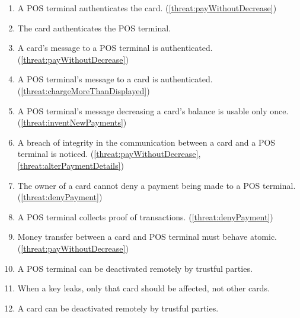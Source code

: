 \begin{enumerate}[label={SR\arabic*:}, leftmargin=3\parindent]
    \item \label{sr:POSAuthCard}
    A POS terminal authenticates the card. (\ref{threat:payWithoutDecrease})
    \item \label{sr:cardAuthPOS}
    The card authenticates the POS terminal.
    \item \label{sr:POScardMessageAuth}
    A card's message to a POS terminal is authenticated. (\ref{threat:payWithoutDecrease})
    \item \label{sr:cardPOSMessageAuth}
    A POS terminal's message to a card is authenticated. (\ref{threat:chargeMoreThanDisplayed})
    \item \label{sr:noReplayDecreasingCard}
    A POS terminal's message decreasing a card's balance is usable only once. (\ref{threat:inventNewPayments})
    \item \label{sr:cardPOSMessageIntegrity}
    A breach of integrity in the communication between a card and a POS terminal is noticed. (\ref{threat:payWithoutDecrease}, \ref{threat:alterPaymentDetails})
    \item \label{sr:cardNonRepudiation}
    The owner of a card cannot deny a payment being made to a POS terminal. (\ref{threat:denyPayment})
    \item \label{sr:proofTransaction}
    A POS terminal collects proof of transactions. (\ref{threat:denyPayment})
    \item \label{sr:cardPOStransterAtomic}
    Money transfer between a card and POS terminal must behave atomic. (\ref{threat:payWithoutDecrease})
    \item \label{sr:disablePOS}
    A POS terminal can be deactivated remotely by trustful parties.

    \item \label{sr:keyLeakage}
    When a key leaks, only that card should be affected, not other cards.
    \item \label{sr:disableCard}
    A card can be deactivated remotely by trustful parties.
\end{enumerate}

